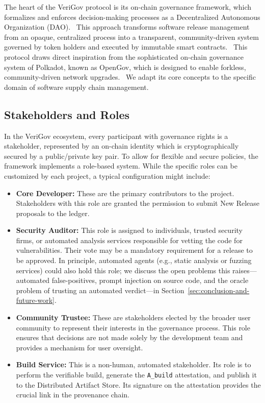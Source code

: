\documentclass{article}
\begin{document}
The heart of the VeriGov protocol is its on-chain governance framework, which formalizes and enforces decision-making processes as a Decentralized Autonomous Organization (DAO).~\cite{dupont2017dao} This approach transforms software release management from an opaque, centralized process into a transparent, community-driven system governed by token holders and executed by immutable smart contracts.~\cite{dupont2017dao} This protocol draws direct inspiration from the sophisticated on-chain governance system of Polkadot, known as OpenGov, which is designed to enable forkless, community-driven network upgrades.~\cite{wood2016polkadot} We adapt its core concepts to the specific domain of software supply chain management.

\subsection{Stakeholders and Roles}

In the VeriGov ecosystem, every participant with governance rights is a stakeholder, represented by an on-chain identity which is cryptographically secured by a public/private key pair. To allow for flexible and secure policies, the framework implements a role-based system. While the specific roles can be customized by each project, a typical configuration might include:

\begin{itemize}
\item \textbf{Core Developer:} These are the primary contributors to the project. Stakeholders with this role are granted the permission to submit New Release proposals to the ledger.
\item \textbf{Security Auditor:} This role is assigned to individuals, trusted security firms, or automated analysis services responsible for vetting the code for vulnerabilities. Their vote may be a mandatory requirement for a release to be approved. In principle, automated agents (e.g., static analysis or fuzzing services) could also hold this role; we discuss the open problems this raises---automated false-positives, prompt injection on source code, and the oracle problem of trusting an automated verdict---in Section~\ref{sec:conclusion-and-future-work}.
\item \textbf{Community Trustee:} These are stakeholders elected by the broader user community to represent their interests in the governance process. This role ensures that decisions are not made solely by the development team and provides a mechanism for user oversight.
\item \textbf{Build Service:} This is a non-human, automated stakeholder. Its role is to perform the verifiable build, generate the \lstinline{A_build} attestation, and publish it to the Distributed Artifact Store. Its signature on the attestation provides the crucial link in the provenance chain.
\end{itemize}
\end{document}
